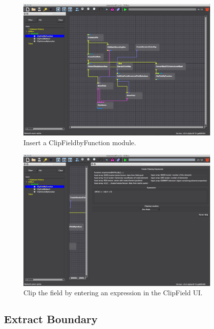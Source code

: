\documentclass[fleqn,11pt,openany]{book}
\begin{document}
\begin{figure}[H]
\center
\includegraphics[width=0.9\textwidth]{BasicTutorial_figures/clipfield.png}
\caption{Insert a ClipFieldbyFunction module.}
\label{fig:clipfield}
\end{figure}

\begin{figure}[H]
\center
\includegraphics[width=0.9\textwidth]{BasicTutorial_figures/clipfield_input.png}
\caption{Clip the field by entering an expression in the ClipField UI.}
\label{fig:clipfield_input}
\end{figure}


\subsection{Extract Boundary}\label{clipvol}
\end{document}

